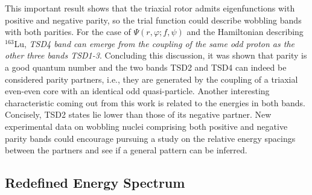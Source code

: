 This important result shows that the triaxial rotor admits eigenfunctions with positive and negative parity, so the trial function could describe wobbling bands with both parities. For the case of $\Psi(r,\varphi;f,\psi)$ and the Hamiltonian describing $^{163}$Lu, \emph{TSD4 band can emerge from the coupling of the same odd proton as the other three bands TSD1-3}. Concluding this discussion, it was shown that parity is a good quantum number and the two bands TSD2 and TSD4 can indeed be considered parity partners, i.e., they are generated by the coupling of a triaxial even-even core with an identical odd quasi-particle. Another interesting characteristic coming out from this work is related to the energies in both bands. Concisely, TSD2 states lie lower than those of its negative partner. New experimental data on wobbling nuclei comprising both positive and negative parity bands could encourage pursuing a study on the relative energy spacings between the partners and see if a general pattern can be inferred.

\subsection{Redefined Energy Spectrum}

